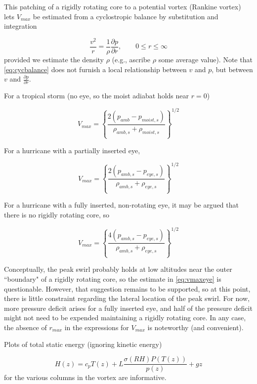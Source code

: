 \documentclass[preprint, prX]{revtex4}
\newcommand{\cbfrac}[2]{\left\{\frac{#1}{#2}\right\}}
\newcommand{\pd}[2]{\frac{\partial#1}{\partial#2}}
\begin{document}
This patching of a rigidly rotating core to a potential vortex (Rankine vortex) lets $V_{max}$ be estimated from a cyclostropic balance by substitution and integration

\begin{equation}
	\frac{v^2}{r} = \frac{1}{\rho} \pd{p}{r}, \qquad 0 \le r \le \infty
	\label{eq:cycbalance}
\end{equation}
provided we estimate the density $\rho$ (e.g., ascribe $\rho$ some average value). Note that \eqref{eq:cycbalance} does not furnish a local relationship between $v$ and $p$, but between $v$ and $\pd{p}{r}$.

For a tropical storm (no eye, so the moist adiabat holds near $r=0$)

\begin{equation}
	V_{max} = \cbfrac{ 2 ( p_{amb} - p_{moist,s})}{ \rho_{amb,s} + \rho_{moist,s} }^{1/2}
\end{equation}

For a hurricane with a partially inserted eye,

\begin{equation}
	V_{max} = \cbfrac{ 2 ( p_{amb,s} - p_{eye,s})}{ \rho_{amb,s} + \rho_{eye,s} }^{1/2}
\end{equation}

For a hurricane with a fully inserted, non-rotating eye, it may be argued that there is no rigidly rotating core, so

\begin{equation}
	V_{max} = \cbfrac{ 4 ( p_{amb,s} - p_{eye,s})}{ \rho_{amb,s} + \rho_{eye,s} }^{1/2}
	\label{eq:vmaxeye}
\end{equation}

Conceptually, the peak swirl probably holds at low altitudes near the outer ``boundary" of a rigidly rotating core, so the estimate in \eqref{eq:vmaxeye} is questionable. However, that suggestion remains to be supported, so at this point, there is little constraint regarding the lateral location of the peak swirl. For now, more pressure deficit arises for a fully inserted eye, and half of the pressure deficit might not need to be expended maintaining a rigidly rotating core. In any case, the absence of $r_{max}$ in the expressions for $V_{max}$ is noteworthy (and convenient).

Plots of total static energy (ignoring kinetic energy)

\begin{equation}
	H(z) = c_p T(z) + L \frac{\sigma(RH) P(T(z))}{p(z)} + g z
\end{equation}
for the various columns in the vortex are informative.
\end{document}
